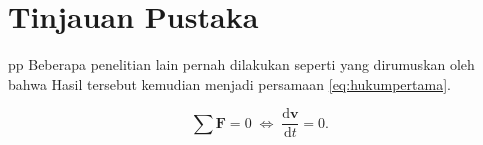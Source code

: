 \section{Tinjauan Pustaka}
\label{sec:tinjauanpustaka}
pp
Beberapa penelitian lain pernah dilakukan seperti yang dirumuskan oleh \citet{newton1687} bahwa \lipsum[5]
Hasil tersebut kemudian menjadi persamaan \ref{eq:hukumpertama}.

\begin{equation}
  \label{eq:hukumpertama}
  \sum \mathbf{F} = 0\; \Leftrightarrow\; \frac{\mathrm{d} \mathbf{v} }{\mathrm{d}t} = 0.
\end{equation}

\lipsum[6-7]